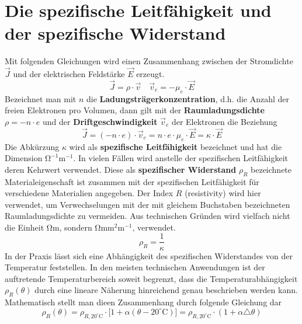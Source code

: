 \section{Die spezifische Leitfähigkeit und der spezifische Widerstand}
Mit folgenden Gleichungen wird einen Zusammenhang zwischen der Stromdichte $\overrightarrow{J}$ und der elektrischen Feldstärke $\overrightarrow{E}$ erzeugt.
\begin{equation}
\boxed{\overrightarrow{J}=\rho\cdot \overrightarrow{v}}\quad \boxed{\overrightarrow{v}_e=-\mu_e\cdot \overrightarrow{E}}
\end{equation}
Bezeichnet man mit $n$ die \textbf{Ladungsträgerkonzentration}, d.h. die Anzahl der freien Elektronen pro Volumen, dann gilt mit der \textbf{Raumladungsdichte} $\rho=-n\cdot e$ und der \textbf{Driftgeschwindigkeit} $\overrightarrow{v}_e$ der Elektronen die Beziehung
\begin{equation}
\boxed{\overrightarrow{J}=\left(-n\cdot e\right)\cdot \overrightarrow{v}_e=n\cdot e\cdot \mu_e\cdot \overrightarrow{E}=\kappa\cdot \overrightarrow{E}}
\end{equation}
Die Abkürzung $\kappa$ wird als \textbf{spezifische Leitfähigkeit} bezeichnet und hat die Dimension ${\mathrm{\Omega}}^{-1}\text{m}^{-1}$. In vielen Fällen wird anstelle der spezifischen Leitfähigkeit deren Kehrwert verwendet. Diese als \textbf{spezifischer Widerstand} $\rho_R$ bezeichnete Materialeigenschaft ist zusammen mit der spezifischen Leitfähigkeit für verschiedene Materialien angegeben. Der Index $R$ (resistivity) wird hier verwendet, um Verwechselungen mit der mit gleichem Buchstaben bezeichneten Raumladungsdichte zu vermeiden. Aus technischen Gründen wird vielfach nicht die Einheit ${\mathrm{\Omega}}\text{m}$, sondern ${\mathrm{\Omega}}\text{mm}^{2}\text{m}^{-1}$, verwendet.
\begin{equation}
\boxed{\rho_R=\dfrac{1}{\kappa}}
\end{equation}
In der Praxis lässt sich eine Abhängigkeit des spezifischen Widerstandes von der Temperatur feststellen. In den meisten technischen Anwendungen ist der auftretende Temperaturbereich soweit begrenzt, dass die Temperaturabhängigkeit $\rho_R\left(\theta\right)$ durch eine lineare Näherung hinreichend genau beschrieben werden kann. Mathematisch stellt man dieen Zusammenhang durch folgende Gleichung dar
\begin{equation}
\boxed{\rho_R\left(\theta\right)=\rho_{R,20^{\circ}\text{C}}\cdot \Big[1+\alpha\left(\theta-20^{\circ}\text{C}\right)\Big]=\rho_{R,20^{\circ}\text{C}}\cdot\left(1+\alpha\triangle \theta\right)}
\end{equation}
